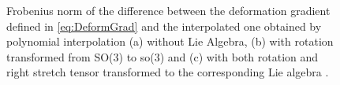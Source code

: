 \documentclass[12pt]{article}
\begin{document}
\begin{figure}[htbp]
  \begin{center}
    \unitlength=1.0mm
    \caption{Frobenius norm of the difference between the deformation gradient 
    defined in \eqref{eq:DeformGrad} and the interpolated one obtained by 
     polynomial interpolation (a) without Lie Algebra,  (b) with rotation transformed from SO(3) to so(3) and (c) with both rotation and right stretch tensor transformed to the corresponding Lie algebra .}
    \label{fig:ExampleRing}
  \end{center}
\end{figure}
\end{document}
